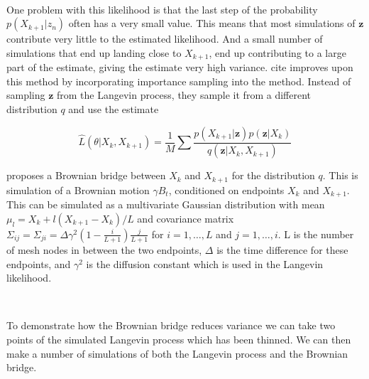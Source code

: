 \

One problem with this likelihood is that the last step of the probability $p(X_{k+1}|z_n)$ often has a very small value. This means that most simulations of $\textbf{z}$ contribute very little to the estimated likelihood. And a small number of simulations that end up landing close to $X_{k+1}$, end up contributing to a large part of the estimate, giving the estimate very high variance. \parencite{durham_numerical_2002}cite{} improves upon this method by incorporating importance sampling into the method. Instead of sampling $\textbf{z}$ from the Langevin process, they sample it from a different distribution $q$ and use the estimate

$$
\hat{L}(\theta|X_k, X_{k+1}) = \frac{1}{M}\sum \frac{p(X_{k+1}|\textbf{z})p(\textbf{z}|X_k)}{q(\textbf{z}|X_k, X_{k+1})}
$$

\parencite{durham_numerical_2002} proposes a Brownian bridge between $X_k$ and $X_{k+1}$ for the distribution $q$. This is simulation of a Brownian motion $\gamma B_t$, conditioned on endpoints $X_k$ and $X_{k+1}$. This can be simulated as a multivariate Gaussian distribution with mean $\mu_l = X_k + l(X_{k+1}-X_k)/L$ and covariance matrix $\Sigma_{ij} = \Sigma_{ji}= \Delta \gamma^2(1-\frac{i}{L+1}) \frac{j}{L+1}$ for $i = 1, \dots , L$ and $j = 1, \dots, i$. L is the number of mesh nodes in between the two endpoints, $\Delta$ is the time difference for these endpoints, and $\gamma^2$ is the diffusion constant which is used in the Langevin likelihood.

\

To demonstrate how the Brownian bridge reduces variance we can take two points of the simulated Langevin process which has been thinned. We can then make a number of simulations of both the Langevin process and the Brownian bridge.

\

